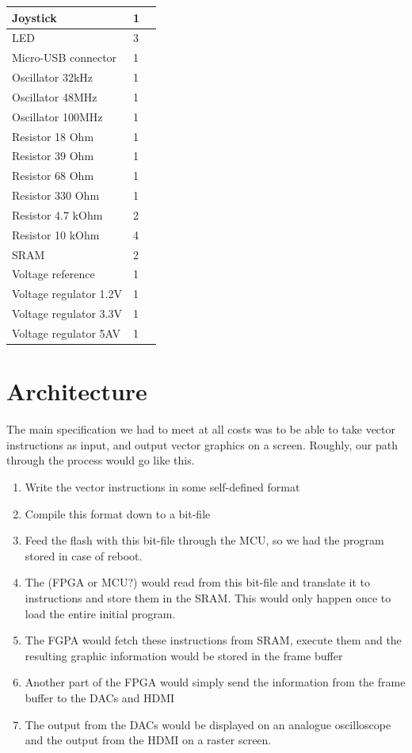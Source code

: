 \begin{longtable}{| p{5cm} | p{2cm} | p{2cm} |}
	Joystick & 1 &\\ \hline
	LED & 3 &\\ \hline
	Micro-USB connector & 1 &\\ \hline
	Oscillator 32kHz & 1 &\\ \hline
	Oscillator 48MHz & 1 &\\ \hline
	Oscillator 100MHz & 1 &\\ \hline
	Resistor 18 Ohm & 1 &\\ \hline
	Resistor 39 Ohm & 1 &\\ \hline
	Resistor 68 Ohm & 1 &\\ \hline
	Resistor 330 Ohm & 1 &\\ \hline
	Resistor 4.7 kOhm & 2 &\\ \hline
	Resistor 10 kOhm & 4 &\\ \hline
	SRAM & 2 &\\ \hline
	Voltage reference & 1 &\\ \hline
	Voltage regulator 1.2V & 1 &\\ \hline
	Voltage regulator 3.3V & 1 &\\ \hline
	Voltage regulator 5AV & 1 &\\
	\hline
\end{longtable}

\section{Architecture}
The main specification we had to meet at all costs was to be able to take vector instructions as input, and output vector graphics on a screen. Roughly, our path through the process would go like this. 
\begin{enumerate}
\item Write the vector instructions in some self-defined format
\item Compile this format down to a bit-file
\item Feed the flash with this bit-file through the MCU, so we had the program stored in case of reboot. 
\item The (FPGA or MCU?) would read from this bit-file and translate it to instructions and store them in the SRAM. This would only happen once to load the entire initial program.
\item The FGPA would fetch these instructions from SRAM, execute them and the resulting graphic information would be stored in the frame buffer
\item Another part of the FPGA would simply send the information from the frame buffer to the DACs and HDMI
\item The output from the DACs would be displayed on an analogue oscilloscope and the output from the HDMI on a raster screen.
\end{enumerate}

